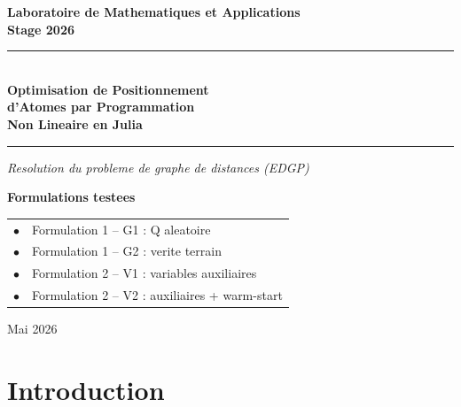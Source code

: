 \documentclass[12pt,a4paper]{article}
\begin{document}
\begin{titlepage}
  \thispagestyle{empty}
  \begin{center}

    \vspace*{1.5cm}
    {\Large\bfseries\color{navyblue}
      Laboratoire de Mathematiques et Applications\\[0.3em]
      \normalfont\large Stage 2026
    }

    \vspace{1.5cm}
    \color{navyblue}\rule{\linewidth}{1.2pt}\\[0.6em]
    {\Huge\bfseries Optimisation de Positionnement\\[0.3em]
      d'Atomes par Programmation\\[0.3em]
      Non Lineaire en Julia}\\[0.6em]
    \color{navyblue}\rule{\linewidth}{1.2pt}

    \vspace{1cm}
    {\large\textit{Resolution du probleme de graphe de distances (EDGP)}}

    \vspace{2cm}
    \begin{tcolorbox}[
      colback=skyblue, colframe=navyblue,
      arc=6pt, boxrule=1pt,
      width=0.75\linewidth]
      \centering
      \textbf{Formulations testees}\\[0.5em]
      \begin{tabular}{ll}
        \textcolor{navyblue}{$\bullet$} & Formulation 1 -- G1 : Q aleatoire \\
        \textcolor{navyblue}{$\bullet$} & Formulation 1 -- G2 : verite terrain \\
        \textcolor{navyblue}{$\bullet$} & Formulation 2 -- V1 : variables auxiliaires \\
        \textcolor{navyblue}{$\bullet$} & Formulation 2 -- V2 : auxiliaires + warm-start \\
      \end{tabular}
    \end{tcolorbox}

    \vfill
    {\large Mai 2026}

  \end{center}
\end{titlepage}

\tableofcontents
\newpage

\section{Introduction}
\end{document}

